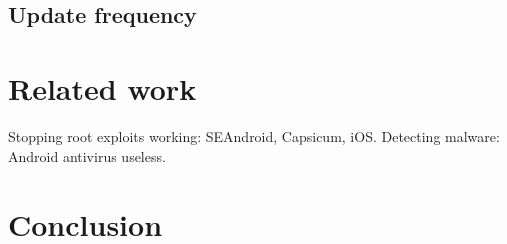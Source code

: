 \documentclass[conference,a4paper,twoside]{IEEEtran}
\begin{document}
\subsection{Update frequency}

\section{Related work}
\label{sec:related}
Stopping root exploits working: SEAndroid, Capsicum, iOS.
Detecting malware: Android antivirus useless.


\section{Conclusion}
\label{sec:conclusion}

\printbibliography
\end{document}
